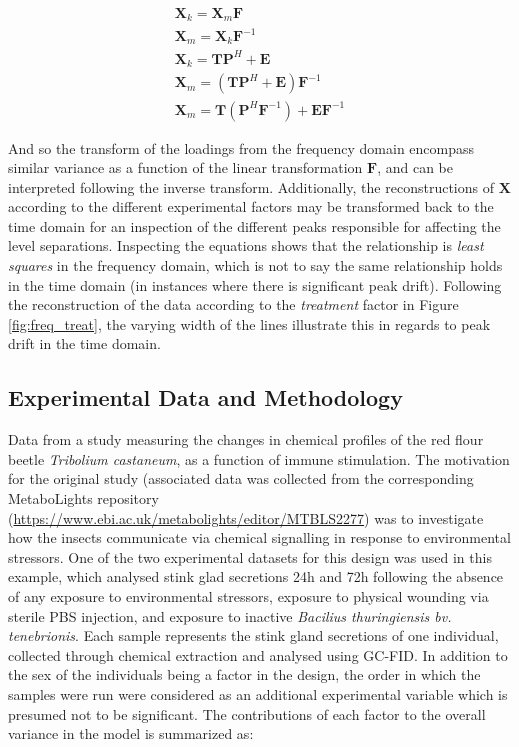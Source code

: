 \documentclass[preprint,12pt]{elsarticle}
\begin{document}
\begin{align}\label{eq:least_squares}
    \mathbf{X}_k = \mathbf{X}_m\mathbf{F}\\
    \mathbf{X}_m = \mathbf{X}_k\mathbf{F}^{-1}\\
    \mathbf{X}_k = \mathbf{T}\mathbf{P}^H + \mathbf{E}\\
    \mathbf{X}_m = \left(\mathbf{T}\mathbf{P}^H + \mathbf{E}\right)\mathbf{F}^{-1}\\
    \mathbf{X}_m = \mathbf{T}\left(\mathbf{P}^H\mathbf{F}^{-1}\right) + \mathbf{E}\mathbf{F}^{-1}
\end{align}

And so the transform of the loadings from the frequency domain encompass similar variance as a function of the linear transformation $\mathbf{F}$, and can be interpreted following the inverse transform. Additionally, the reconstructions of $\mathbf{X}$ according to the different experimental factors may be transformed back to the time domain for an inspection of the different peaks responsible for affecting the level separations. Inspecting the equations shows that the relationship is \textit{least squares} in the frequency domain, which is not to say the same relationship holds in the time domain (in instances where there is significant peak drift). Following the reconstruction of the data according to the \textit{treatment} factor in Figure \ref{fig:freq_treat}, the varying width of the lines illustrate this in regards to peak drift in the time domain.

\subsection{Experimental Data and Methodology}

Data from a study measuring the changes in chemical profiles of the red flour beetle \textit{Tribolium castaneum}, as a function of immune stimulation. The motivation for the original study \cite{lo2023immune} (associated data was collected from the corresponding MetaboLights repository (\url{https://www.ebi.ac.uk/metabolights/editor/MTBLS2277}) was to investigate how the insects communicate via chemical signalling in response to environmental stressors. One of the two experimental datasets for this design was used in this example, which analysed stink glad secretions 24h and 72h following the absence of any exposure to environmental stressors, exposure to physical wounding via sterile PBS injection, and exposure to inactive \textit{Bacilius thuringiensis bv. tenebrionis}. Each sample represents the stink gland secretions of one individual, collected through chemical extraction and analysed using GC-FID. In addition to the sex of the individuals being a factor in the design, the order in which the samples were run were considered as an additional experimental variable which is presumed not to be significant. The contributions of each factor to the overall variance in the model is summarized as:
\end{document}
